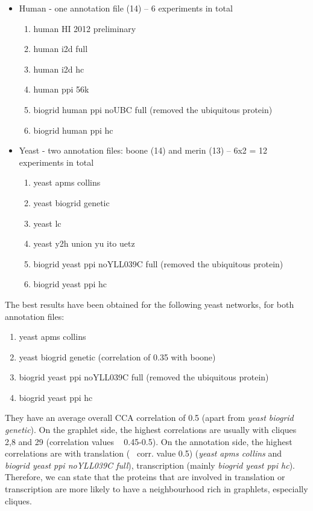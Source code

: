 \documentclass[11pt,a4paper,oneside]{report}
\begin{document}
\begin{itemize}
 \item Human - one annotation file (14) -- 6 experiments in total
 \begin{enumerate}
    \item human HI 2012 preliminary
    \item human i2d full
    \item human i2d hc
    \item human ppi 56k
    \item biogrid human ppi noUBC full (removed the ubiquitous protein)
    \item biogrid human ppi hc
  \end{enumerate}
 \item Yeast - two annotation files: boone (14) and merin (13) -- 6x2 = 12 experiments in total
  \begin{enumerate}
    \item yeast apms collins
    \item yeast biogrid genetic
    \item yeast lc
    \item yeast y2h union yu ito uetz
    \item biogrid yeast ppi noYLL039C full (removed the ubiquitous protein)
    \item biogrid yeast ppi hc
  \end{enumerate}
\end{itemize}

The best results have been obtained for the following yeast networks, for both annotation files:
  \begin{enumerate}
    \item yeast apms collins 
    \item yeast biogrid genetic (correlation of 0.35 with boone)
    \item biogrid yeast ppi noYLL039C full (removed the ubiquitous protein)
    \item biogrid yeast ppi hc
  \end{enumerate}

They have an average overall CCA correlation of 0.5 (apart from \emph{yeast biogrid genetic}). On the graphlet side, the highest correlations are usually with cliques 2,8 and 29 (correlation values ~ 0.45-0.5). On the annotation side, the highest correlations are with translation (~ corr. value 0.5) (\emph{yeast apms collins} and \emph{biogrid yeast ppi noYLL039C full}), transcription (mainly \emph{biogrid yeast ppi hc}). Therefore, we can state that the proteins that are involved in translation or transcription are more likely to have a neighbourhood rich in graphlets, especially cliques.
\end{document}

